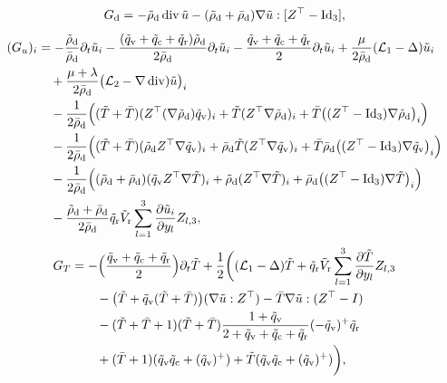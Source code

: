 \documentclass[10pt]{amsart}
\theoremstyle{plain}
\theoremstyle{definition}
\theoremstyle{thm}
\numberwithin{equation}{section}
\newcommand{\cL}{\mathcal{L}}
\DeclareMathOperator{\mdiv}{div}
\newcommand{\del}{\partial}
\newcommand{\dt}{\del_t}
\newcommand{\rd}{\mathrm{d}}
\newcommand{\rr}{\mathrm{r}}
\newcommand{\rv}{\mathrm{v}}
\newcommand{\rc}{\mathrm{c}}
\newcommand{\trho}{\Tilde{\rho}}
\newcommand{\tu}{\Tilde{u}}
\newcommand{\tT}{\Tilde{T}}
\newcommand{\tq}{\Tilde{q}}
\newcommand{\tV}{\Tilde{V}}
\begin{document}
\begin{equation*}
    G_\rd = -\trho_\rd\mdiv\tu-(\trho_\rd + \bar{\rho}_\rd )\nabla\tu:[Z^\top-\mathrm{Id}_3],
\end{equation*}
\begin{equation*}
    \begin{aligned}
        (G_{u})_{i}
        &= - \frac{\trho_\rd}{\bar{\rho}_\rd}\del_t\tu_{i} - \frac{(\tq_\rv + \tq_\rc + \tq_\rr) \trho_\rd}{2 \bar{\rho}_\rd} \dt \tu_i - \frac{\tq_\rv + \tq_\rc + \tq_\rr}{2} \dt \tu_i + \frac{\mu}{ 2\bar{\rho}_\rd} (\cL_1 - \Delta) \tu_i\\
        &\quad + \frac{\mu+\lambda}{ 2\bar{\rho}_\rd} \bigl(\cL_2 - \nabla \mdiv) \tu\bigr)_i\\
        &\quad-\frac{1}{2 \bar{\rho}_\rd}\Bigl((\tT + \bar{T} )(Z^\top (\nabla \trho_\rd) \tq_\rv )_i+ \tT (Z^\top \nabla \trho_\rd)_i + \bar{T} \bigl ((Z^\top - \mathrm{Id}_3 ) \nabla \trho_\rd \bigr )_i\Bigr)\\
        &\quad -\frac{1}{2 \bar{\rho}_\rd}\Bigl( (\tT + \bar{T}) (\trho_\rd Z^\top \nabla \tq_\rv )_i+ \bar{\rho}_\rd \tT (Z^\top \nabla \tq_\rv)_i +\bar{T}\bar{\rho}_\rd \bigl ( (Z^\top - \mathrm{Id}_3) \nabla \tq_\rv \bigr )_i  \Bigr) \\
        &\quad -\frac{1}{2 \bar{\rho}_\rd}\Bigl( (\trho_\rd + \bar{\rho}_\rd ) (\tq_\rv Z^\top \nabla \tT )_i + \trho_\rd (Z^\top \nabla \tT)_i + \bar{\rho}_\rd \bigl ( (Z^\top - \mathrm{Id}_3 )\nabla \tT \bigr )_i  \Bigr)\\
        &\quad - \frac{\trho_\rd + \bar{\rho}_\rd}{2\bar{\rho}_\rd}\tq_\rr\tV_\rr\sum_{l=1}^3\frac{\del \tu_i}{\del y_l}Z_{l,3} ,
    \end{aligned}
\end{equation*}
\begin{equation*}
    \begin{aligned}
        G_T
        &= -\Bigl( \frac{\tq_\rv + \tq_\rc + \tq_\rr}{2}\Bigr)\del_t\tT + \frac{1}{2}\biggl((\cL_1 - \Delta) \tT + \tq_\rr\tV_\rr\sum_{l=1}^3 \frac{\del\tT}{\del y_{l}} Z_{l,3}\\
        &\qquad - \bigl (\tT + \tq_\rv ( \tT + \bar{T}) \bigr) (\nabla \tu:Z^\top)-\bar{T}\nabla \tu:(Z^\top-I)\\
        &\qquad -( \tT + \bar{T} +1 ) (\tT +\bar{T}) \frac{1+\tq_\rv}{2 + \tq_\rv + \tq_\rc + \tq_\rr} (-\tq_\rv)^+ \tq_\rr \\
        & \qquad + (\bar{T}+1) ( \tq_\rv \tq_\rc + (\tq_\rv)^+ ) + \tT(\tq_\rv \tq_\rc + (\tq_\rv)^+ ) \biggr ),
    \end{aligned}
\end{equation*}
\end{document}
